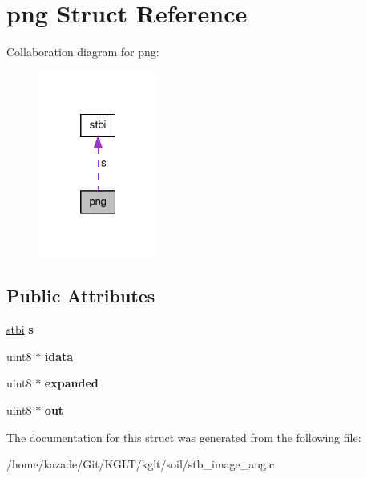 \hypertarget{structpng}{\section{png Struct Reference}
\label{structpng}
}


Collaboration diagram for png\-:\nopagebreak
\begin{figure}[H]
\begin{center}
\leavevmode
\includegraphics[width=112pt]{structpng__coll__graph}
\end{center}
\end{figure}
\subsection*{Public Attributes}
\begin{DoxyCompactItemize}
\item 
\hypertarget{structpng_a95ebf389a681442b47ea0caabb1d5681}{\hyperlink{structstbi}{stbi} {\bfseries s}}\label{structpng_a95ebf389a681442b47ea0caabb1d5681}

\item 
\hypertarget{structpng_a5cd944fdf0f0417a344bcc538ed98ed6}{uint8 $\ast$ {\bfseries idata}}\label{structpng_a5cd944fdf0f0417a344bcc538ed98ed6}

\item 
\hypertarget{structpng_a474dd0da8ac0347924e68f5de7e68c55}{uint8 $\ast$ {\bfseries expanded}}\label{structpng_a474dd0da8ac0347924e68f5de7e68c55}

\item 
\hypertarget{structpng_ada33c39620ad9a647c088c40d21887f6}{uint8 $\ast$ {\bfseries out}}\label{structpng_ada33c39620ad9a647c088c40d21887f6}

\end{DoxyCompactItemize}


The documentation for this struct was generated from the following file\-:\begin{DoxyCompactItemize}
\item 
/home/kazade/\-Git/\-K\-G\-L\-T/kglt/soil/stb\-\_\-image\-\_\-aug.\-c\end{DoxyCompactItemize}
